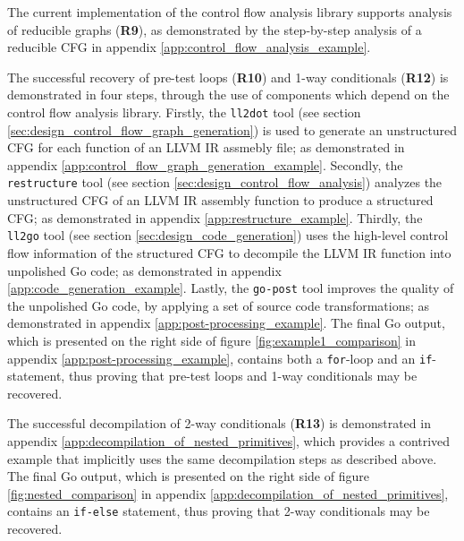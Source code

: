 
The current implementation of the control flow analysis library supports analysis of reducible graphs (\textbf{R9}), as demonstrated by the step-by-step analysis of a reducible CFG in appendix \ref{app:control_flow_analysis_example}.


The successful recovery of pre-test loops (\textbf{R10}) and 1-way conditionals (\textbf{R12}) is demonstrated in four steps, through the use of components which depend on the control flow analysis library. Firstly, the \texttt{ll2dot} tool (see section \ref{sec:design_control_flow_graph_generation}) is used to generate an unstructured CFG for each function of an LLVM IR assmebly file; as demonstrated in appendix \ref{app:control_flow_graph_generation_example}. Secondly, the \texttt{restructure} tool (see section \ref{sec:design_control_flow_analysis}) analyzes the unstructured CFG of an LLVM IR assembly function to produce a structured CFG; as demonstrated in appendix \ref{app:restructure_example}. Thirdly, the \texttt{ll2go} tool (see section \ref{sec:design_code_generation}) uses the high-level control flow information of the structured CFG to decompile the LLVM IR function into unpolished Go code; as demonstrated in appendix \ref{app:code_generation_example}. Lastly, the \texttt{go-post} tool improves the quality of the unpolished Go code, by applying a set of source code transformations; as demonstrated in appendix \ref{app:post-processing_example}. The final Go output, which is presented on the right side of figure \ref{fig:example1_comparison} in appendix \ref{app:post-processing_example}, contains both a \texttt{for}-loop and an \texttt{if}-statement, thus proving that pre-test loops and 1-way conditionals may be recovered.


The successful decompilation of 2-way conditionals (\textbf{R13}) is demonstrated in appendix \ref{app:decompilation_of_nested_primitives}, which provides a contrived example that implicitly uses the same decompilation steps as described above. The final Go output, which is presented on the right side of figure \ref{fig:nested_comparison} in appendix \ref{app:decompilation_of_nested_primitives}, contains an \texttt{if-else} statement, thus proving that 2-way conditionals may be recovered.


